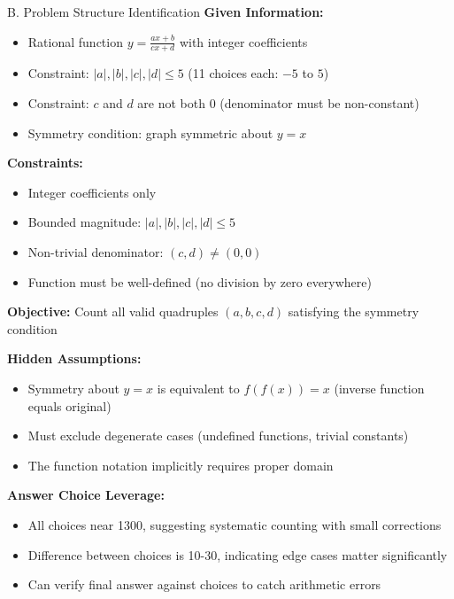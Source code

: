 \documentclass[12pt]{article}
\begin{document}
\begin{configbox}{B. Problem Structure Identification}
\textbf{Given Information:}
\begin{itemize}
    \item Rational function $y = \frac{ax+b}{cx+d}$ with integer coefficients
    \item Constraint: $|a|, |b|, |c|, |d| \leq 5$ (11 choices each: $-5$ to $5$)
    \item Constraint: $c$ and $d$ are not both $0$ (denominator must be non-constant)
    \item Symmetry condition: graph symmetric about $y=x$
\end{itemize}

\textbf{Constraints:}
\begin{itemize}
    \item Integer coefficients only
    \item Bounded magnitude: $|a|, |b|, |c|, |d| \leq 5$
    \item Non-trivial denominator: $(c,d) \neq (0,0)$
    \item Function must be well-defined (no division by zero everywhere)
\end{itemize}

\textbf{Objective:} Count all valid quadruples $(a,b,c,d)$ satisfying the symmetry condition

\textbf{Hidden Assumptions:}
\begin{itemize}
    \item Symmetry about $y=x$ is equivalent to $f(f(x)) = x$ (inverse function equals original)
    \item Must exclude degenerate cases (undefined functions, trivial constants)
    \item The function notation implicitly requires proper domain
\end{itemize}

\textbf{Answer Choice Leverage:}
\begin{itemize}
    \item All choices near 1300, suggesting systematic counting with small corrections
    \item Difference between choices is 10-30, indicating edge cases matter significantly
    \item Can verify final answer against choices to catch arithmetic errors
\end{itemize}
\end{configbox}
\end{document}
